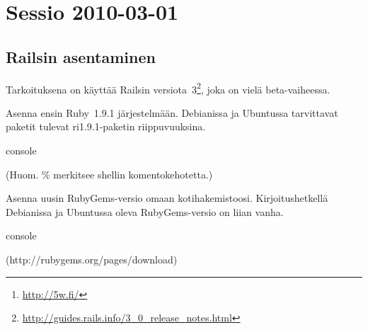 \documentclass{article}
\title{\eng{5w Ruby on Rails workshop}}
\author{Johan Kiviniemi}
\begin{document}
\maketitle

\begin{abstract}
Jotain dokumentaationtynkää 5w:n\footnote{\url{http://5w.fi/}}, Tampereen
hackerspacen, Rails-opiskeluprojektista.
\end{abstract}

\tableofcontents

\section{Sessio 2010-03-01}

\subsection{Railsin asentaminen}

\begin{samepage}
Tarkoituksena on käyttää Railsin
versiota~3\footnote{\url{http://guides.rails.info/3\_0\_release\_notes.html}},
joka on vielä beta-vaiheessa.

Asenna ensin Ruby~1.9.1 järjestelmään. Debianissa ja Ubuntussa tarvittavat
paketit tulevat ri1.9.1-paketin riippuvuuksina.

\begin{pygmented}{console}
\end{pygmented}

(Huom. \% merkitsee shellin komentokehotetta.)
\end{samepage}

\begin{samepage}
Asenna uusin RubyGems-versio omaan kotihakemistoosi. Kirjoitushetkellä
Debianissa ja Ubuntussa oleva RubyGems-versio on liian vanha.

\begin{pygmented}{console}

(http://rubygems.org/pages/download)



\end{pygmented}
\end{samepage}
\end{document}
